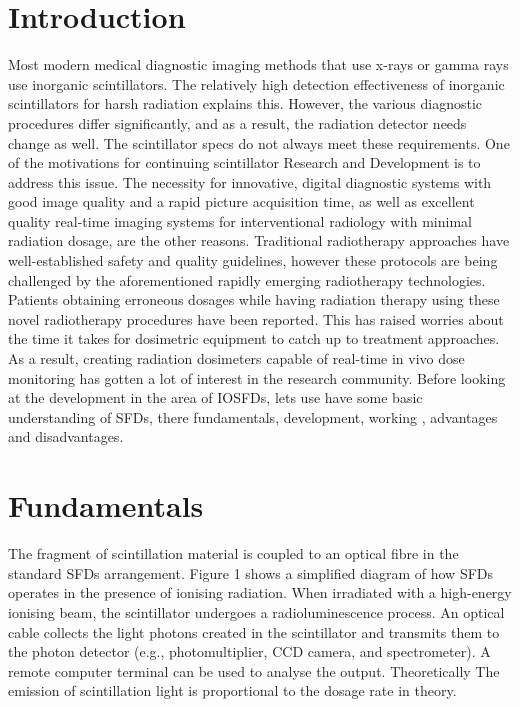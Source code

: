 \documentclass{article}
\begin{document}
\begin{multicols}{2}

\section{Introduction}

Most modern medical diagnostic imaging methods that use x-rays or gamma rays use inorganic scintillators. The relatively high detection effectiveness of inorganic scintillators for harsh radiation explains this. However, the various diagnostic procedures differ significantly, and as a result, the radiation detector needs change as well. The scintillator specs do not always meet these requirements.\cite{van2002inorganic} One of the motivations for continuing scintillator Research and Development is to address this issue. The necessity for innovative, digital diagnostic systems with good image quality and a rapid picture acquisition time, as well as excellent quality real-time imaging systems for interventional radiology with minimal radiation dosage, are the other reasons. Traditional radiotherapy approaches have well-established safety and quality guidelines, however these protocols are being challenged by the aforementioned rapidly emerging radiotherapy technologies.\cite{cowen2008design} Patients obtaining erroneous dosages while having radiation therapy using these novel radiotherapy procedures have been reported. This has raised worries about the time it takes for dosimetric equipment to catch up to treatment approaches. As a result, creating radiation dosimeters capable of real-time in vivo dose monitoring has gotten a lot of interest in the research community. Before looking at the development in the area of IOSFDs, lets use have some basic understanding of SFDs, there fundamentals, development, working , advantages and disadvantages.

\section{Fundamentals}
The fragment of scintillation material is coupled to an optical fibre in the standard SFDs arrangement. Figure 1 shows a simplified diagram of how SFDs operates in the presence of ionising radiation. When irradiated with a high-energy ionising beam, the scintillator undergoes a radioluminescence process. An optical cable collects the light photons created in the scintillator and transmits them to the photon detector (e.g., photomultiplier, CCD camera, and spectrometer). A remote computer terminal can be used to analyse the output. Theoretically The emission of scintillation light is proportional to the dosage rate in theory.\cite{stajanca2019pof} 


\end{multicols}
\end{document}
